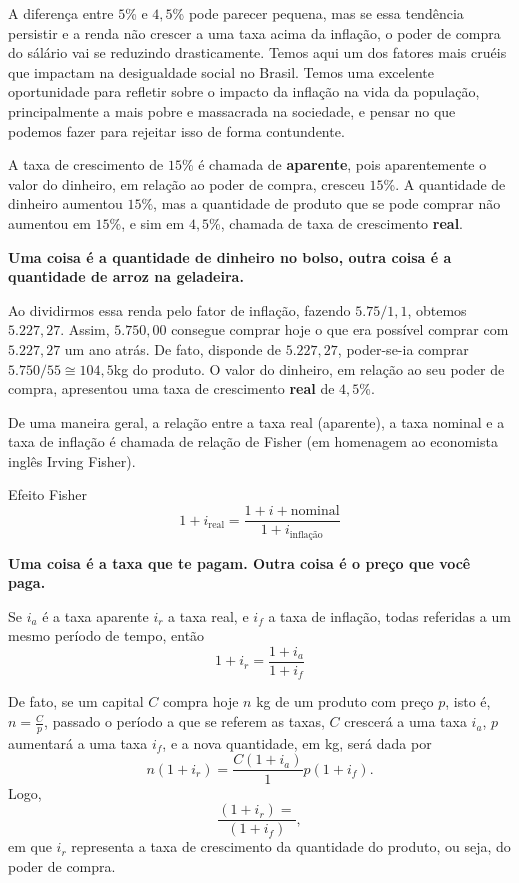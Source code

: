 A diferença entre $5$\% e $4{,}5$\% pode parecer pequena, mas se essa tendência persistir e a renda não crescer a uma taxa acima da inflação, o poder de compra do sálário vai se reduzindo drasticamente. Temos aqui um dos fatores mais cruéis que impactam na desigualdade social no Brasil. Temos uma excelente oportunidade para refletir sobre o impacto da inflação na vida da população, principalmente a mais pobre e massacrada na sociedade, e pensar no que podemos fazer para rejeitar isso de forma contundente.

A taxa de crescimento de $15$\% é chamada de \textbf{aparente}, pois aparentemente o valor do dinheiro, em relação ao poder de compra, cresceu $15$\%. A quantidade de dinheiro aumentou $15$\%, mas a quantidade de produto que se pode comprar não aumentou em $15$\%, e sim em $4{,}5$\%, chamada de taxa de crescimento \textbf{real}. 

\textbf{Uma coisa é a quantidade de dinheiro no bolso, outra coisa é a quantidade de arroz na geladeira.}

Ao dividirmos essa renda pelo fator de inflação, fazendo $5.75/1{,}1$, obtemos $5.227{,}27$. Assim, $5.750{,}00$ consegue comprar hoje o que era possível comprar com $5.227{,}27$ um ano atrás. De fato, disponde de $5.227{,}27$, poder-se-ia comprar $5.750/55\cong 104{,}5$kg do produto. O valor do dinheiro, em relação ao seu poder de compra, apresentou uma taxa de crescimento \textbf{real} de $4{,}5$\%.

De uma maneira geral, a relação entre a taxa real (aparente), a taxa nominal e a taxa de inflação é chamada de relação de Fisher (em homenagem ao economista inglês Irving Fisher).

\begin{center}
Efeito Fisher
\begin{equation*}
1+i_{\text{real}}=\frac{1+i+{\text{nominal}}}{1+i_{\text{inflação}}}
\end{equation*}
\end{center}

\textbf{Uma coisa é a taxa que te pagam. Outra coisa é o preço que você paga.}

\needspace{.15\textheight}
\begin{knowledge}
Se $i_a$ é a taxa aparente $i_r$ a taxa real, e $i_f$ a taxa de inflação, todas referidas a um mesmo período de tempo, então
\begin{equation*}
1+i_r=\frac{1+i_a}{1+i_f}
\end{equation*}

De fato, se um capital $C$ compra hoje $n$ kg de um produto com preço $p$, isto é, $\displaystyle n=\frac{C}{p}$, passado o período a que se referem as taxas, $C$ crescerá a uma taxa $i_a$, $p$ aumentará a uma taxa $i_f$, e a nova quantidade, em kg, será dada por
\begin{equation*}
n(1+i_r)=\frac{C(1+i_a)}1{p(1+i_f)}.
\end{equation*}
Logo,
\begin{equation*}
\frac{(1+i_r)=}{(1+i_f)},
\end{equation*}
em que $i_r$ representa a taxa de crescimento da quantidade do produto, ou seja, do poder de compra.
\end{knowledge}

